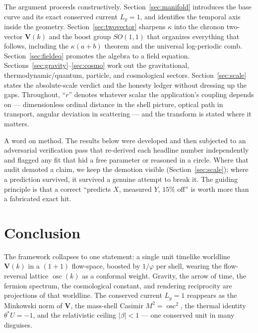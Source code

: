\documentclass[11pt,onecolumn]{article}
\theoremstyle{plain}
\theoremstyle{definition}
\theoremstyle{remark}
\newcommand{\phigr}{\varphi}                         %
\DeclareMathOperator{\osc}{osc}                       %
\newcommand{\Vvec}{\mathbf{V}}                        %
\newcommand{\rap}{\theta}                             %
\newcommand{\Ly}{L_{y}}                               %
\begin{document}
The argument proceeds constructively. Section~\ref{sec:manifold} introduces the
base curve and its exact conserved current $\Ly=1$, and identifies the temporal
axis inside the geometry. Section~\ref{sec:twovector} sharpens $\kappa$ into the
chronon two-vector $\Vvec(k)$ and the boost group $SO(1,1)$ that organizes
everything that follows, including the $\kappa(a{+}b)$ theorem and the universal
log-periodic comb. Section~\ref{sec:fieldeq} promotes the algebra to a field
equation. Sections~\ref{sec:gravity}--\ref{sec:cosmo} work out the gravitational,
thermodynamic/quantum, particle, and cosmological sectors. Section~\ref{sec:scale}
states the absolute-scale verdict and the honesty ledger without dressing up the
gaps. Throughout, ``$r$'' denotes whatever scalar the application's coupling
depends on --- dimensionless ordinal distance in the shell picture, optical path
in transport, angular deviation in scattering --- and the transform is stated
where it matters.

A word on method. The results below were developed and then subjected to an
adversarial verification pass that re-derived each headline number independently
and flagged any fit that hid a free parameter or reasoned in a circle. Where that
audit demoted a claim, we keep the demotion visible (Section~\ref{sec:scale});
where a prediction survived, it survived a genuine attempt to break it. The guiding
principle is that a correct ``predicts $X$, measured $Y$, $15\%$ off'' is worth
more than a fabricated exact hit.










\section{Conclusion}\label{sec:conclusion}

The framework collapses to one statement: a single unit timelike worldline
$\Vvec(k)$ in a $(1{+}1)$ flow-space, boosted by $1/\phigr$ per shell, wearing the
flow-reversal lattice $\osc(k)$ as a conformal weight. Gravity, the arrow of time,
the fermion spectrum, the cosmological constant, and rendering reciprocity are
projections of that worldline. The conserved current $\Ly=1$ reappears as the
Minkowski norm of $\Vvec$, the mass-shell Casimir $M^2=\osc^2$, the thermal
identity $\rap^{*}U=-1$, and the relativistic ceiling $|\beta|<1$ --- one conserved
unit in many disguises.
\end{document}
